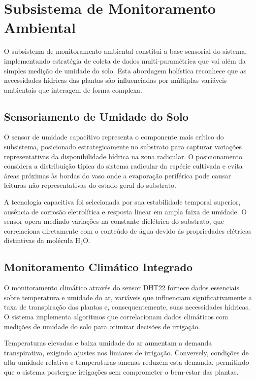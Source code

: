 \section{Subsistema de Monitoramento Ambiental}

O subsistema de monitoramento ambiental constitui a base sensorial do sistema, implementando estratégia de coleta de dados multi-paramétrica que vai além da simples medição de umidade do solo. Esta abordagem holística reconhece que as necessidades hídricas das plantas são influenciadas por múltiplas variáveis ambientais que interagem de forma complexa.

\subsection{Sensoriamento de Umidade do Solo}

O sensor de umidade capacitivo representa o componente mais crítico do subsistema, posicionado estrategicamente no substrato para capturar variações representativas da disponibilidade hídrica na zona radicular. O posicionamento considera a distribuição típica do sistema radicular da espécie cultivada e evita áreas próximas às bordas do vaso onde a evaporação periférica pode causar leituras não representativas do estado geral do substrato.

A tecnologia capacitiva foi selecionada por sua estabilidade temporal superior, ausência de corrosão eletrolítica e resposta linear em ampla faixa de umidade. O sensor opera medindo variações na constante dielétrica do substrato, que correlaciona diretamente com o conteúdo de água devido às propriedades elétricas distintivas da molécula H₂O.

\subsection{Monitoramento Climático Integrado}

O monitoramento climático através do sensor DHT22 fornece dados essenciais sobre temperatura e umidade do ar, variáveis que influenciam significativamente a taxa de transpiração das plantas e, consequentemente, suas necessidades hídricas. O sistema implementa algoritmos que correlacionam dados climáticos com medições de umidade do solo para otimizar decisões de irrigação.

Temperaturas elevadas e baixa umidade do ar aumentam a demanda transpirativa, exigindo ajustes nos limiares de irrigação. Conversely, condições de alta umidade relativa e temperaturas amenas reduzem esta demanda, permitindo que o sistema postergue irrigações sem comprometer o bem-estar das plantas.

